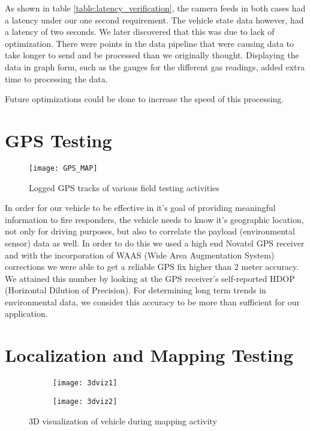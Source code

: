 As shown in table \ref{table:latency_verification}, the camera feeds in both cases had a latency under our one second requirement.  The vehicle state data however, had a latency of two seconds.  We later discovered that this was due to lack of optimization.  There were points in the data pipeline that were causing data to take longer to send and be processed than we originally thought.  Displaying the data in graph form, such as the gauges for the different gas readings, added extra time to processing the data.

Future optimizations could be done to increase the speed of this processing.

\section{GPS Testing}
\begin{figure}[H]
	\centerline{\texttt{[image: GPS\_MAP]}}
	\caption[]{Logged GPS tracks of various field testing activities}
	\label{fig:GPSMAP}
\end{figure}

In order for our vehicle to be effective in it's goal of providing meaningful information to fire responders, the vehicle needs to know it's geographic location, not only for driving purposes, but also to correlate the payload (environmental sensor) data as well. In order to do this we used a high end Novatel GPS receiver and with the incorporation of WAAS (Wide Area Augmentation System) corrections we were able to get a reliable GPS fix higher than 2 meter accuracy. We attained this number by looking at the GPS receiver's self-reported HDOP (Horizontal Dilution of Precision). For determining long term trends in environmental data, we consider this accuracy to be more than sufficient for our application.

\section{Localization and Mapping Testing}

\begin{figure}[H]
	\centering
	\begin{subfigure}{.5\textwidth}
		\centering
		\texttt{[image: 3dviz1]}
		\label{fig:3dviz1}
	\end{subfigure}%
	\begin{subfigure}{.5\textwidth}
		\centering
		\texttt{[image: 3dviz2]}
		\label{fig:3dviz2}
	\end{subfigure}
	\caption{3D visualization of vehicle during mapping activity}
	\label{fig:3dviz}
\end{figure}


